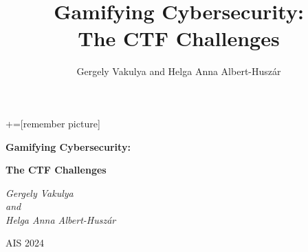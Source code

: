 \documentclass[12 pt]{beamer}
\author{Gergely Vakulya and Helga Anna Albert-Huszár}
\title{Gamifying Cybersecurity:\\The CTF Challenges}
\institute{}
\date{}
\newcommand{\titleimage}{title}			%
\begin{document}
+=[remember picture]

{

\begin{frame}[c]
\begin{center}

  \Large
  \textbf{Gamifying Cybersecurity:}

  \textbf{The CTF Challenges}

  \qquad
  
  \textit{Gergely Vakulya\\and\\Helga Anna Albert-Huszár}
  
  \qquad

  AIS 2024
  


	
	

\end{center}
\end{frame}}
\end{document}
